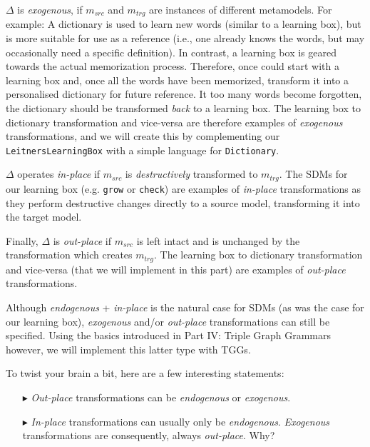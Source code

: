 $\Delta$ is \emph{exogenous}, if $m_{src}$ and $m_{trg}$ are instances of different metamodels. For example: A dictionary is used to learn new
words (similar to a learning box), but is more suitable for use as a reference (i.e., one already knows the words, but may occasionally need a specific
definition). In contrast, a learning box is geared towards the actual memorization process. Therefore, once could start with a learning box and, once all the
words have been memorized, transform it into a personalised dictionary for future reference. It too many words become forgotten, the dictionary should be
transformed \emph{back} to a learning box. The learning box to dictionary transformation and vice-versa are therefore examples of \emph{exogenous}
transformations, and we will create this by complementing our \texttt{LeitnersLearningBox} with a simple language for \texttt{Dictionary}.

$\Delta$ operates \emph{in-place} if $m_{src}$ is \emph{destructively} transformed to $m_{trg}$. The SDMs for our
learning box (e.g. \texttt{grow} or \texttt{check}) are examples of \emph{in-place} transformations as they perform destructive changes directly to a source
model, transforming it into the target model.

Finally, $\Delta$ is \emph{out-place} if $m_{src}$ is left intact and is unchanged by the transformation which
creates $m_{trg}$. The learning box to dictionary transformation and vice-versa (that we will implement in this part) are examples of \emph{out-place}
transformations.

Although \emph{endogenous} + \emph{in-place} is the natural case for SDMs (as was the case for our learning box), \emph{exogenous} and/or \emph{out-place}
transformations can still be specified. Using the basics introduced in Part IV: Triple Graph Grammars however, we will implement this latter type with
TGGs.
 
To twist your brain a bit, here are a few interesting statements:
\begin{enumerate}

\item[$\blacktriangleright$] \emph{Out-place} transformations can be \emph{endogenous} or \emph{exogenous}.

\item[$\blacktriangleright$] \emph{In-place} transformations can usually only be \emph{endogenous}. \emph{Exogenous} transformations are consequently,
always \emph{out-place}.  Why?

\end{enumerate}  

